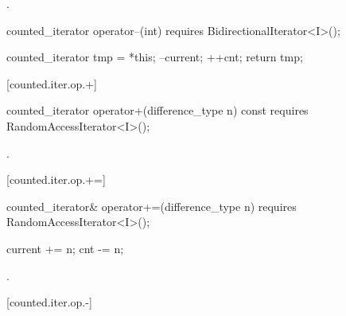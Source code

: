 \begin{addedblock}
\begin{itemdescr}
\pnum
\returns {}.
\end{itemdescr}

%
%
\begin{itemdecl}
  counted_iterator operator--(int)
    requires BidirectionalIterator<I>();
\end{itemdecl}

\begin{itemdescr}
\pnum
\effects {}
\begin{codeblock}
counted_iterator tmp = *this;
--current;
++cnt;
return tmp;
\end{codeblock}
\end{itemdescr}

[counted.iter.op.+]{}

%
%
\begin{itemdecl}
  counted_iterator operator+(difference_type n) const
    requires RandomAccessIterator<I>();
\end{itemdecl}

\begin{itemdescr}
\pnum
\requires {}

\pnum
\oldtxt{\returns}
.
\end{itemdescr}

[counted.iter.op.+=]{}

%
%
\begin{itemdecl}
  counted_iterator& operator+=(difference_type n)
    requires RandomAccessIterator<I>();
\end{itemdecl}

\begin{itemdescr}
\pnum
\requires {}

\pnum
\effects
\begin{codeblock}
current += n;
cnt -= n;
\end{codeblock}

\pnum
\returns {}.
\end{itemdescr}

[counted.iter.op.-]{}


\end{addedblock}
